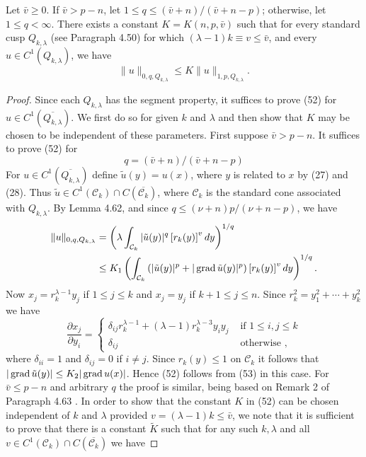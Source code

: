 \begin{lemma}
  Let $\bar{v} \geq 0$. If $\bar{v}>p-n$, let $1 \leq q \leq(\bar{v}+n) /(\bar{v}+n-p)$; otherwise, let $1 \leq q<\infty$. There exists a constant $K=K(n, p, \bar{v})$ such that for every standard cusp $Q_{k, \lambda}$ (see Paragraph 4.50) for which $(\lambda-1) k \equiv v \leq \bar{v}$, and every $u \in C^1\left(Q_{k, \lambda}\right)$, we have
  \[
  \|u\|_{0, q, Q_{k, \lambda}} \leq K\|u\|_{1, p, Q_{k, \lambda}} .
  \]
\end{lemma}

\begin{proof}
  Since each $Q_{k, \lambda}$ has the segment property, it suffices to prove (52) for $u \in C^1\left(\overline{Q_{k, \lambda}}\right)$. We first do so for given $k$ and $\lambda$ and then show that $K$ may be chosen to be independent of these parameters.
  First suppose $\bar{v}>p-n$. It suffices to prove (52) for
  \[
  q=(\bar{v}+n) /(\bar{v}+n-p)
  \]
  For $u \in C^1\left(\overline{Q_{k, \lambda}}\right)$ define $\tilde{u}(y)=u(x)$, where $y$ is related to $x$ by (27) and (28). Thus $\tilde{u} \in C^1\left(\mathcal{C}_k\right) \cap C\left(\overline{\mathcal{C}_k}\right)$, where $\mathcal{C}_k$ is the standard cone associated with $Q_{k, \lambda}$. By Lemma 4.62, and since $q \leq(\nu+n) p /(\nu+n-p)$, we have
  \[
  \begin{aligned}
  \|u\|_{0, q, Q_{k, \lambda}} & =\left(\lambda \int_{\mathcal{C}_k}|\tilde{u}(y)|^q\left[r_k(y)\right]^v d y\right)^{1 / q} \\
  & \leq K_1\left(\int_{\mathcal{C}_k}\left(|\tilde{u}(y)|^p+|\operatorname{grad} \tilde{u}(y)|^p\right)\left[r_k(y)\right]^v d y\right)^{1 / q} .
  \end{aligned}
  \]
  Now $x_j=r_k^{\lambda-1} y_j$ if $1 \leq j \leq k$ and $x_j=y_j$ if $k+1 \leq j \leq n$. Since $r_k^2=y_1^2+\cdots+y_k^2$ we have
  \[
  \frac{\partial x_j}{\partial y_i}= \begin{cases}\delta_{i j} r_k^{\lambda-1}+(\lambda-1) r_k^{\lambda-3} y_i y_j & \text { if } 1 \leq i, j \leq k \\ \delta_{i j} & \text { otherwise },\end{cases}
  \]
  where $\delta_{i i}=1$ and $\delta_{i j}=0$ if $i \neq j$. Since $r_k(y) \leq 1$ on $\mathcal{C}_k$ it follows that
  $|\operatorname{grad} \tilde{u}(y)| \leq K_2|\operatorname{grad} u(x)|$.
  Hence (52) follows from (53) in this case. For $\bar{v} \leq p-n$ and arbitrary $q$ the proof is similar, being based on Remark 2 of Paragraph 4.63 .
  In order to show that the constant $K$ in (52) can be chosen independent of $k$ and $\lambda$ provided $v=(\lambda-1) k \leq \bar{v}$, we note that it is sufficient to prove that there is a constant $\tilde{K}$ such that for any such $k, \lambda$ and all $v \in C^1\left(\mathcal{C}_k\right) \cap C\left(\overline{\mathcal{C}_k}\right)$ we have

\end{proof}
